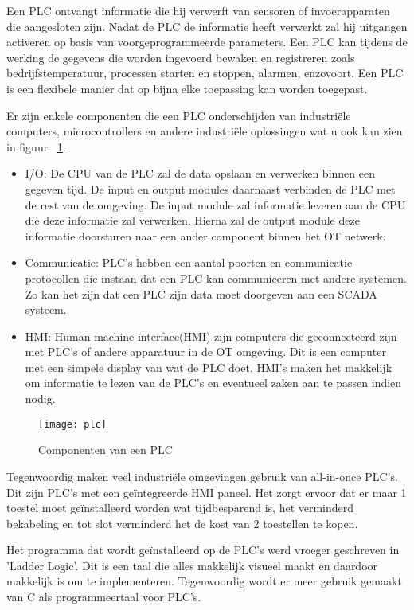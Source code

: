 Een PLC ontvangt informatie die hij verwerft van sensoren of invoerapparaten die aangesloten zijn. Nadat de PLC de informatie heeft verwerkt zal hij uitgangen activeren op basis van voorgeprogrammeerde parameters. Een PLC kan tijdens de werking de gegevens die worden ingevoerd bewaken en registreren zoals bedrijfstemperatuur, processen starten en stoppen, alarmen, enzovoort. Een PLC is een flexibele manier dat op bijna elke toepassing kan worden toegepast.

Er zijn enkele componenten die een PLC onderschijden van industriële computers, microcontrollers en andere industriële oplossingen wat u ook kan zien in figuur ~\ref{fig:2.5}.
\begin{itemize}
    \item I/O: De CPU van de PLC zal de data opslaan en verwerken binnen een gegeven tijd. De input en output modules daarnaast verbinden de PLC met de rest van de omgeving. De input module zal informatie leveren aan de CPU die deze informatie zal verwerken. Hierna zal de output module deze informatie doorsturen naar een ander component binnen het OT netwerk. 
    \item Communicatie: PLC's hebben een aantal poorten en communicatie protocollen die instaan dat een PLC kan communiceren met andere systemen. Zo kan het zijn dat een PLC zijn data moet doorgeven aan een SCADA systeem.
    \item HMI: Human machine interface(HMI) zijn computers die geconnecteerd zijn met PLC's of andere apparatuur in de OT omgeving. Dit is een computer met een simpele display van wat de PLC doet. HMI's maken het makkelijk om informatie te lezen van de PLC's en eventueel zaken aan te passen indien nodig.
\end{itemize}
\begin{figure}
    \texttt{[image: plc]}
    \caption{Componenten van een PLC\autocite{Unitronics} \label{fig:2.5}} 
\end{figure}


Tegenwoordig maken veel industriële omgevingen gebruik van all-in-once PLC's. Dit zijn PLC's met een geïntegreerde HMI paneel. Het zorgt ervoor dat er maar 1 toestel moet geïnstalleerd worden wat tijdbesparend is, het verminderd bekabeling en tot slot verminderd het de kost van 2 toestellen te kopen.

Het programma dat wordt geïnstalleerd op de PLC's werd vroeger geschreven in 'Ladder Logic'. Dit is een taal die alles makkelijk visueel maakt en daardoor makkelijk is om te implementeren. Tegenwoordig wordt er meer gebruik gemaakt van C als programmeertaal voor PLC's.

